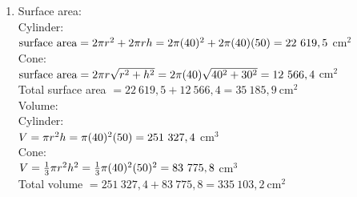 \begin{eocsolutions}{}
{\begin{enumerate}[itemsep=5pt, label=\textbf{\arabic*}. ]
\begin{enumerate}[itemsep=5pt, label=\textbf{(\alph*)} ]
Square pyramid:\\
$V = \frac{1}{3} A \times h \\
= \frac{1}{3} (15)^2 \times 12 \\
= 900 ~$cm$^{3}$\\

Half sphere:\\
$V = \dfrac{(\frac{4}{3}\pi r^{3})}{2}\\
= \dfrac{(\frac{4}{3} \pi (4)^3)}{2}\\
= 134 ~$cm$^{3}$
      \end{enumerate}
\item Surface area:\\
Cylinder:\\
$\mbox{surface area} = 2 \pi r^2 + 2\pi rh\\
= 2 \pi(40)^2 + 2\pi(40)(50)\\
= 22~619,5 ~$cm$^{2}$\\
Cone:\\
$\mbox{surface area} = 2 \pi r \sqrt{r^2 + h^2}\\
= 2 \pi (40) \sqrt{40^2 + 30^2} \\
= 12~566,4 ~$cm$^{2}$\\
Total surface area $= 22~619,5 + 12~566,4 = 35~185,9 ~$cm$^{2}$\\
Volume:\\
Cylinder:\\
$V =  \pi r^2 h\\
=  \pi(40)^2 (50)\\
= 251~327,4 ~$cm$^{3}$\\
Cone:\\
$V = \frac{1}{3} \pi r^2 h^2\\
= \frac{1}{3} \pi (40)^2  (50)^2 \\
= 83~775,8 ~$cm$^{3}$\\
Total volume $= 251~327,4 + 83~775,8 = 335~103,2 ~$cm$^{2}$\\
\end{enumerate}}
\end{eocsolutions}


